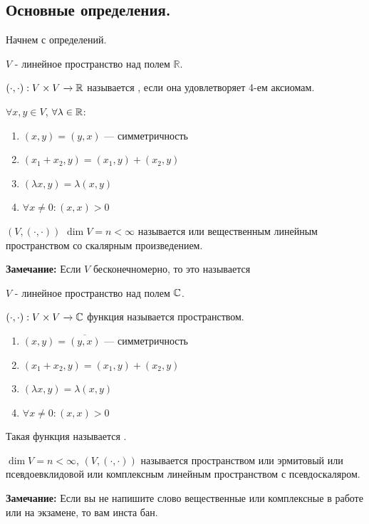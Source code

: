 \subsection{Основные определения.}

Начнем с определений. 

 $V$ - линейное пространство над полем $\mathbb{R}$.

$(\cdot, \cdot ): V\times V \xrightarrow{} \mathbb{R}$ называется , если она удовлетворяет 4-ем аксиомам.

$\forall x,y \in V$, $\forall \lambda \in \mathbb{R}$:

\begin{enumerate}
    \item $(x,y) = (y,x)$ --- симметричность
    \item $(x_1 +x_2,y) = (x_1,y)+(x_2,y)$
    \item $(\lambda x, y) = \lambda (x,y)$
    \item $\forall x \neq 0: (x,x)>0$
\end{enumerate}

 $(V, (\cdot, \cdot))$ $\dim V =n<\infty$ называется  или вещественным линейным пространством со скалярным произведением.

\textbf{Замечание:} Если $V$ бесконечномерно, то это называется 

 $V$ - линейное пространство над полем $\mathbb{C}$.

$(\cdot, \cdot): V\times V \xrightarrow{} \mathbb{C}$ функция называется  пространством.

\begin{enumerate}
    \item $(x,y) = \overline{(y,x)}$ --- симметричность
    \item $(x_1 +x_2,y) = (x_1,y)+(x_2,y)$
    \item $(\lambda x, y) = \lambda (x,y)$
    \item $\forall x \neq 0: (x,x)>0$
\end{enumerate}

Такая функция называется .

 $\dim V = n < \infty$, $(V, (\cdot, \cdot))$ называется  пространством или эрмитовый или псевдоевклидовой или комплексным линейным пространством с псевдоскаляром.

\textbf{Замечание:} Если вы не напишите слово вещественные или комплексные в работе или на экзамене, то вам инста бан.

